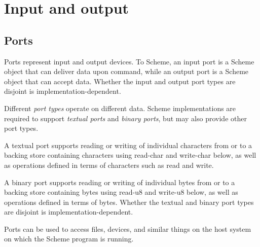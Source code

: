 \section{Input and output}

\subsection{Ports}
\label{portsection}

Ports represent input and output devices.  To Scheme, an input port is
a Scheme object that can deliver data upon command, while an output
port is a Scheme object that can accept data.
Whether the input and output port types are disjoint is
implementation-dependent.

Different {\em port types} operate on different data.  Scheme
imple\-men\-ta\-tions are required to support {\em textual ports}
and {\em binary ports}, but may also provide other port types.

A textual port supports reading or writing of individual characters
from or to a backing store containing characters
using {\cf read-char} and {\cf write-char} below, as well as operations
defined in terms of characters such as {\cf read} and {\cf write}.

A binary port supports reading or writing of individual bytes from
or to a backing store containing bytes using {\cf read-u8} and {\cf
write-u8} below, as well as operations defined in terms of bytes.
Whether the textual and binary port types are disjoint is
implementation-dependent.

Ports can be used to access files, devices, and similar things on the host
system on which the Scheme program is running.

